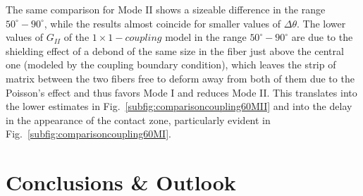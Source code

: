 \documentclass[review]{elsarticle}
\begin{document}
The same comparison for Mode II shows a sizeable difference in the range $50^{\circ}-90^{\circ}$, while the results almost coincide for smaller values of $\Delta\theta$. The lower values of $G_{II}$ of the $1\times 1-coupling$ model in the range $50^{\circ}-90^{\circ}$ are due to the shielding effect of a debond of the same size in the fiber just above the central one (modeled by the coupling boundary condition), which leaves the strip of matrix between the two fibers free to deform away from both of them due to the Poisson’s effect and thus favors Mode I and reduces Mode II. This translates into the lower estimates in Fig.~\ref{subfig:comparisoncoupling60MII} and into the delay in the appearance of the contact zone, particularly evident in Fig.~\ref{subfig:comparisoncoupling60MI}.

\section{Conclusions \& Outlook}
\end{document}
